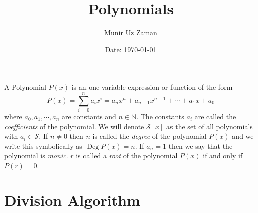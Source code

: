 \documentclass[11pt,numbers=noenddot,svgnames,dvipsnames]{scrartcl}
\title{Polynomials}
\author{Munir Uz Zaman}
\date{Date: \today}
\DeclareMathOperator{\Deg}{Deg}
\begin{document}
\maketitle

\begin{definition}
    A Polynomial $P(x)$ is an one variable expression or function of the form
    \[
        P(x) = \sum_{i=0}^{n} a_{i}x^{i} = a_{n}x^{n} + a_{n-1}x^{n-1} + \cdots +a_{1}x + a_{0}
    \]
    where $a_{0},a_{1}, \cdots, a_{n}$ are constants and $n \in \mathbb{N}$. The constants $a_{i}$ are called the 
    \textit{coefficients} of the polynomial. We will denote $\mathcal{S}[x]$ as the set of all polynomials with $a_{i} \in \mathcal{S}$. If 
    $n\neq 0$ then $n$ is called the \textit{degree} of the polynomial $P(x)$ and we write this symbolically as $\Deg P(x)=n$. 
    If $a_{n} = 1$ then we say that the polynomial is \textit{monic}. 
    $r$ is called a \textit{root} of the polynomial $P(x)$ if and only if $P(r)=0$.
\end{definition}

\section{Division Algorithm}
\end{document}
